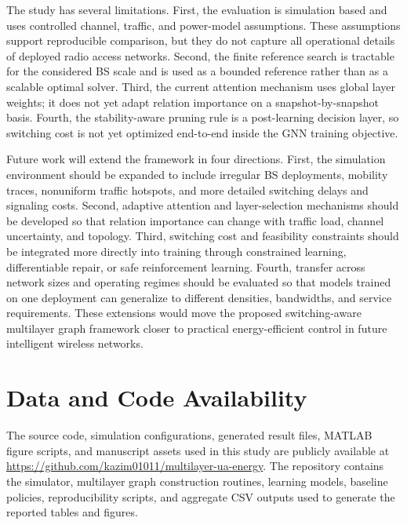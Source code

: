 \documentclass[journal]{IEEEtran}
\begin{document}
The study has several limitations. First, the evaluation is simulation based
and uses controlled channel, traffic, and power-model assumptions. These
assumptions support reproducible comparison, but they do not capture all
operational details of deployed radio access networks. Second, the finite
reference search is tractable for the considered BS scale and is used as a
bounded reference rather than as a scalable optimal solver. Third, the current
attention mechanism uses global layer weights; it does not yet adapt relation
importance on a snapshot-by-snapshot basis. Fourth, the stability-aware pruning
rule is a post-learning decision layer, so switching cost is not yet optimized
end-to-end inside the GNN training objective.

Future work will extend the framework in four directions. First, the
simulation environment should be expanded to include irregular BS deployments,
mobility traces, nonuniform traffic hotspots, and more detailed switching
delays and signaling costs. Second, adaptive attention and layer-selection
mechanisms should be developed so that relation importance can change with
traffic load, channel uncertainty, and topology. Third, switching cost and
feasibility constraints should be integrated more directly into training
through constrained learning, differentiable repair, or safe reinforcement
learning. Fourth, transfer across network sizes and operating regimes should be
evaluated so that models trained on one deployment can generalize to different
densities, bandwidths, and service requirements. These extensions would move
the proposed switching-aware multilayer graph framework closer to practical
energy-efficient control in future intelligent wireless networks.

\section*{Data and Code Availability}
The source code, simulation configurations, generated result files, MATLAB
figure scripts, and manuscript assets used in this study are publicly available
at \url{https://github.com/kazim01011/multilayer-ua-energy}. The repository
contains the simulator, multilayer graph construction routines, learning
models, baseline policies, reproducibility scripts, and aggregate CSV outputs
used to generate the reported tables and figures.



\end{document}
